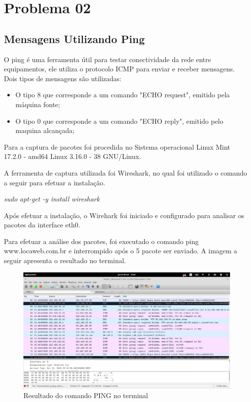 \chapter[Problema 02]{Problema 02}

\section{Mensagens Utilizando Ping}

O ping é uma ferramenta útil para testar conectividade da rede entre equipamentos, ele utiliza o protocolo ICMP para enviar e receber mensagens. Dois tipos de mensagens são utilizadas: 

\begin{itemize}
	\item O tipo 8 que corresponde a um comando "ECHO request", emitido pela máquina fonte; 
	\item O tipo 0 que corresponde a um comando "ECHO reply", emitido pelo maquina alcançada; 
\end{itemize}

Para a captura de pacotes foi procedida no Sistema operacional Linux Mint 17.2.0 - amd64 Linux 3.16.0 - 38 GNU/Linux.

A ferramenta de captura utilizada foi Wireshark, no qual foi utilizado o comando a seguir para efetuar a instalação.

\emph{sudo apt-get -y install wireshark}

Após efetuar a instalação, o Wirehark foi iniciado e configurado para analisar os pacotes da interface eth0.

Para efetuar a análise dos pacotes, foi executado o comando ping www.locaweb.com.br e interrompido após o 5 pacote ser enviado. A imagem a seguir apresenta o resultado no terminal.

  \begin{figure}[h]
    \centering

    \includegraphics[width=450px, scale=1]{figuras/ping}
    \caption{Resultado do comando PING no terminal}

 \label{fig:1}
  \end{figure}

